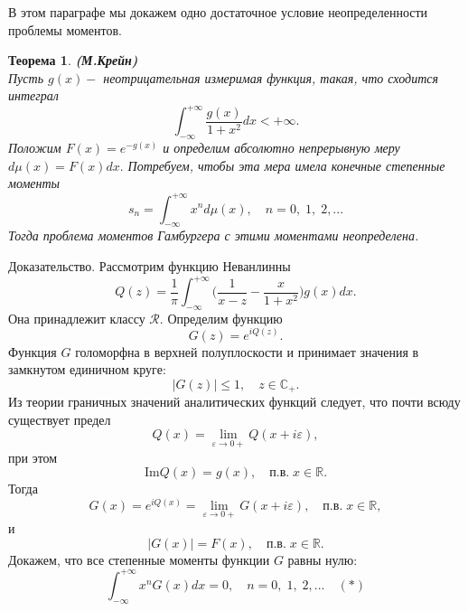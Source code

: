 \documentclass[12 pt, a4 paper]{article}
\theoremstyle{plain}   \newtheorem{Pro}{Задача}
\newtheorem{The}{Теорема}
\begin{document}
В этом параграфе мы докажем одно достаточное условие
неопределенности проблемы моментов.
\begin{The}
{\bfseries (М.Крейн)}
\\
Пусть
$ g(x) - $
неотрицательная измеримая функция, такая, что сходится интеграл
$$
  \int _{-\infty}^{+\infty}
  \frac{g(x)}{1+x^2}dx<+\infty .
$$
Положим
$ F(x)=e^{-g(x)} $
и определим абсолютно непрерывную меру
$ d\mu (x)=F(x)dx . $
Потребуем, чтобы эта мера имела конечные степенные моменты
$$
  s_n = \int _{-\infty}^{+\infty} x^n d\mu (x),
  \quad n=0, \; 1, \; 2,...
$$
Тогда проблема моментов Гамбургера с этими моментами неопределена.
\end{The}						
{\Large Доказательство.}
Рассмотрим функцию Неванлинны
$$
  Q(z)=\frac{1}{\pi} \int _{-\infty}^{+\infty}
  \biggl ( \frac{1}{x-z}-\frac{x}{1+x^2} \biggr )
  g(x)dx.
$$
Она принадлежит классу
$ \mathcal{R} . $
Определим функцию
$$
  G(z)=e^{iQ(z)}.
$$
Функция
$ G $
голоморфна в верхней полуплоскости и принимает значения в
замкнутом единичном круге:
$$
  |G(z)| \leq 1, \quad z \in \mathbb{C}_+ .
$$
Из теории граничных значений аналитических функций следует,
что почти всюду существует предел
$$
  Q(x)= \lim _{\varepsilon \rightarrow 0+}
  Q(x+i \varepsilon ),
$$
при этом
$$
  \mathrm {Im} Q(x)=g(x), \quad п.в. \; x \in \mathbb{R} .
$$
Тогда
$$
  G(x)=e^{iQ(x)}=
  \lim _{\varepsilon \rightarrow 0+}
  G(x+i \varepsilon ),
  \quad п.в. \; x \in \mathbb{R} ,
$$
и
$$
  |G(x)|=F(x), \quad п.в. \; x \in \mathbb{R} .
$$
Докажем, что все степенные моменты функции
$ G $
равны нулю:
$$
  \int _{-\infty}^{+\infty}
  x^n G(x)dx=0, \quad n=0, \; 1, \; 2,...
  \quad (\ast )
$$
\\
\end{document}
